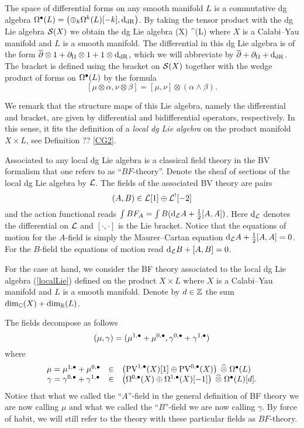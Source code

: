 \documentclass[11pt]{amsart}
\def\pv{{\rm PV}}
\begin{document}
The space of differential forms on any smooth manifold $L$ is a commutative dg algebra $\Omega^{\bullet}(L) = \left(\oplus_{k}\Omega^{k}(L)[-k], {\rm d}_{{\rm dR}}\right)$.
By taking the tensor product with the dg Lie algebra $\mathcal S(X)$ we obtain the dg Lie algebra
\beqn\label{localLie}
  \cS(X) \; \Hat{\otimes} \; \Omega^{\bu}(L)
\eeqn
where $X$ is a Calabi--Yau manifold and $L$ is a smooth manifold.
The differential in this dg Lie algebra is of the form $\overline{\partial} \otimes 1 + \partial_\Omega \otimes 1 + 1 \otimes {\rm d}_{\rm dR}$, which we will abbreviate by $\overline{\partial} + \partial_\Omega + {\rm d}_{\rm dR}$.
The bracket is defined using the bracket on $\mathcal S(X)$ together with the wedge product of forms on $\Omega^\bullet(L)$ by the formula
\[
  [\mu \otimes \alpha, \nu \otimes \beta] = [\mu, \nu] \otimes (\alpha \wedge \beta) .
\]


We remark that the structure maps of this Lie algebra, namely the differential and bracket, are given by differential and bidifferential operators, respectively.
In this sense, it fits the definition of a {\em local dg Lie algebra} on the product manifold $X \times L$, see Definition ?? \ref{CG2}.

Associated to any local dg Lie algebra is a classical field theory in the BV formalism that one refers to as ``$BF$-theory''.
Denote the sheaf of sections of the local dg Lie algebra by $\mathcal L$.
The fields of the associated BV theory are pairs
\[
  (A, B) \in \mathcal L[1] \oplus \mathcal L^{!}[-2]
\]
and the action functional reads $\int B F_{A} = \int B ({\rm d}_{\mathcal L}A + \frac12 [A,A])$.
Here ${\rm d}_{\mathcal L}$ denotes the differential on $\mathcal L$ and $[\cdot,\cdot]$ is the Lie bracket.
Notice that the equations of motion for the $A$-field is simply the Maurer--Cartan equation ${\rm d}_\mathcal L A + \frac12 [A,A] = 0$.
For the $B$-field the equations of motion read ${\rm d}_\mathcal L B + [A, B] = 0$.

For the case at hand, we consider the BF theory associated to the local dg Lie algebra (\ref{localLie}) defined on the product $X \times L$ where $X$ is a Calabi--Yau manifold and $L$ is a smooth manifold.
Denote by $d \in \mathbb Z$ the sum $\dim_{\mathbb C}(X) + \dim_{\mathbb R}(L)$.

The fields decompose as follows
\[
(\mu, \gamma) = (\mu^{1,\bullet} + \mu^{0,\bullet}, \gamma^{0,\bullet}+\gamma^{1,\bullet})
\]
where
\[
  \begin{array}{ccl}
    \mu = \mu^{1,\bu}+\mu^{0,\bu} & \in & \left(\pv^{1,\bu}(X)[1] \oplus \pv^{0,\bu}(X) \right) \; \Hat{\otimes} \; \Omega^{\bu}(L) \\
    \gamma = \gamma^{0,\bu} + \gamma^{1,\bu} & \in & \left(\Omega^{0,\bu}(X) \oplus \Omega^{1,\bu}(X)[-1] \right) \; \Hat{\otimes}\; \Omega^{\bu}(L)[d] .
  \end{array}
\]
Notice that what we called the ``$A$''-field in the general definition of BF theory we are now calling $\mu$ and what we called the ``$B$''-field we are now calling $\gamma$.
By force of habit, we will still refer to the theory with these particular fields as $BF$-theory.
\end{document}
